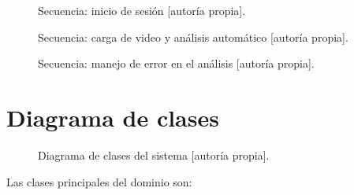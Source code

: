 \begin{figure}[ht]
\centering
\caption{Secuencia: inicio de sesión [autoría propia].}
\label{fig:seq_login}
\end{figure}

\begin{figure}[ht]
\centering
\caption{Secuencia: carga de video y análisis automático [autoría propia].}
\label{fig:seq_analisis}
\end{figure}

\begin{figure}[ht]
\centering
\caption{Secuencia: manejo de error en el análisis [autoría propia].}
\label{fig:seq_error}
\end{figure}

\section{Diagrama de clases}

\begin{figure}[ht]
\centering
\caption{Diagrama de clases del sistema [autoría propia].}
\label{fig:clases}
\end{figure}

Las clases principales del dominio son:

